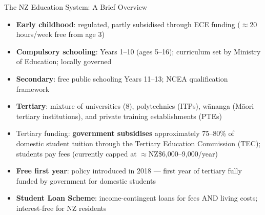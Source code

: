 \documentclass[aspectratio=169, 12pt]{beamer}
\begin{document}
\begin{frame}{The NZ Education System: A Brief Overview}
  \footnotesize
  \begin{itemize}
    \item \textbf{Early childhood}: regulated, partly subsidised through ECE funding
          ($\approx$20 hours/week free from age 3)
    \item \textbf{Compulsory schooling}: Years 1--10 (ages 5--16); curriculum set by
          Ministry of Education; locally governed
    \item \textbf{Secondary}: free public schooling Years 11--13; NCEA qualification framework
    \item \textbf{Tertiary}: mixture of universities (8), polytechnics (ITPs), w\={a}nanga (M\=aori
          tertiary institutions), and private training establishments (PTEs)
    \item Tertiary funding: \textbf{government subsidises} approximately 75--80\% of domestic
          student tuition through the Tertiary Education Commission (TEC); students pay fees
          (currently capped at $\approx$NZ\$6,000--9,000/year)
    \item \textbf{Free first year}: policy introduced in 2018 --- first year of tertiary
          fully funded by government for domestic students
    \item \textbf{Student Loan Scheme}: income-contingent loans for fees AND living costs;
          interest-free for NZ residents
  \end{itemize}
\end{frame}

\end{document}
